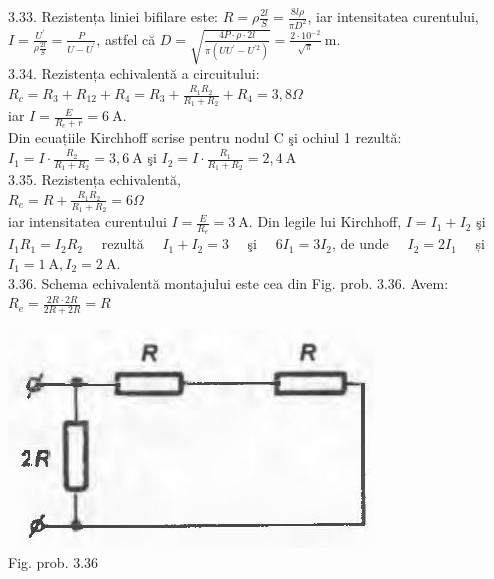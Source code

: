 3.33. Rezistența liniei bifilare este: $R=\rho \frac{2 l}{S}=\frac{8 l \rho}{\pi D^{2}}$, iar intensitatea curentului, $I=\frac{U^{\prime}}{\rho \frac{2 l}{S}}=\frac{P}{U-U^{\prime}}$, astfel că $D=\sqrt{\frac{4 P \cdot \rho \cdot 2 l}{\pi\left(U U^{\prime}-U^{\prime 2}\right)}}=\frac{2 \cdot 10^{-2}}{\sqrt{\pi}} \mathrm{~m}$.\\

3.34. Rezistența echivalentă a circuitului:\\ $R_{c}=R_{3}+R_{12}+R_{4}=R_{3}+\frac{R_{1} R_{2}}{R_{1}+R_{2}}+R_{4}=3,8 \Omega$\\ iar $I=\frac{E}{R_{c}+r}=6 \mathrm{~A}$.\\ Din ecuațiile Kirchhoff scrise pentru nodul C şi ochiul 1 rezultă:\\ $I_{1}=I \cdot \frac{R_{2}}{R_{1}+R_{2}}=3,6 \mathrm{~A}$ şi $I_{2}=I \cdot \frac{R_{1}}{R_{1}+R_{2}}=2,4 \mathrm{~A}$\\

3.35. Rezistența echivalentă,\\ $R_{e}=R+\frac{R_{1} R_{2}}{R_{1}+R_{2}}=6 \Omega$\\ iar intensitatea curentului $I=\frac{E}{R_{e}}=3 \mathrm{~A}$. Din legile lui Kirchhoff, $I=I_{1}+I_{2}$ şi $I_{1} R_{1}=I_{2} R_{2} \quad$ rezultă $\quad I_{1}+I_{2}=3 \quad$ şi $\quad 6 I_{1}=3 I_{2}$, de unde $\quad I_{2}=2 I_{1} \quad$ și $I_{1}=1 \mathrm{~A}, I_{2}=2 \mathrm{~A}$.\\

3.36. Schema echivalentă montajului este cea din Fig. prob. 3.36. Avem:\\ $R_{e}=\frac{2 R \cdot 2 R}{2 R+2 R}=R$\\ \begin{center} \includegraphics[max width=\textwidth]{images/2025_07_01_5b3ff9fa0d508c8e9f17g-348}\\ Fig. prob. 3.36 \end{center}\\

